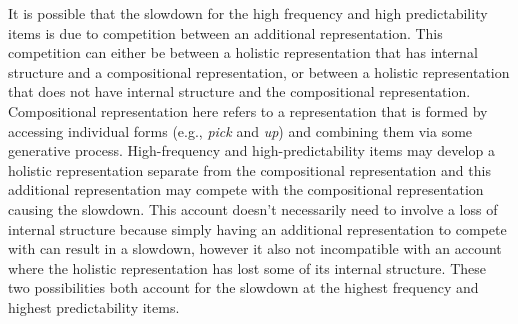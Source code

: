 \documentclass[
  12pt,
  letterpaper,
]{scrreprt}
\begin{document}
It is possible that the slowdown for the high frequency and high
predictability items is due to competition between an additional
representation. This competition can either be between a holistic
representation that has internal structure and a compositional
representation, or between a holistic representation that does not have
internal structure and the compositional representation. Compositional
representation here refers to a representation that is formed by
accessing individual forms (e.g., \emph{pick} and \emph{up}) and
combining them via some generative process. High-frequency and
high-predictability items may develop a holistic representation separate
from the compositional representation and this additional representation
may compete with the compositional representation causing the slowdown.
This account doesn't necessarily need to involve a loss of internal
structure because simply having an additional representation to compete
with can result in a slowdown, however it also not incompatible with an
account where the holistic representation has lost some of its internal
structure. These two possibilities both account for the slowdown at the
highest frequency and highest predictability items.
\end{document}
